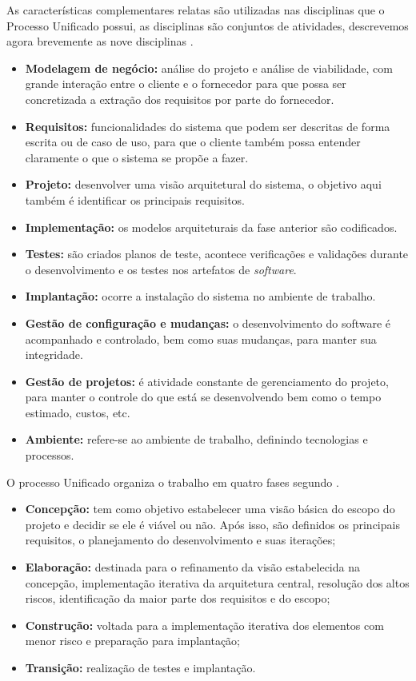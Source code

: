 As características complementares relatas são utilizadas nas disciplinas que o Processo Unificado possui, as disciplinas são conjuntos de atividades, descrevemos agora brevemente as nove disciplinas \cite{larman2007utilizando}.

\begin{itemize}
	\item \textbf{Modelagem de negócio:} análise do projeto e análise de viabilidade, com grande interação entre o cliente e o fornecedor para que possa ser concretizada a extração dos requisitos por parte do fornecedor.
	\item \textbf{Requisitos:} funcionalidades do sistema que podem ser descritas de forma escrita ou de caso de uso, para que o cliente também possa entender claramente o que o sistema se propõe a fazer.
	\item \textbf{Projeto:} desenvolver uma visão arquitetural do sistema, o objetivo aqui também é identificar os principais requisitos.
	\item \textbf{Implementação:} os modelos arquiteturais da fase anterior são codificados.
	\item \textbf{Testes:} são criados planos de teste, acontece verificações e validações durante o desenvolvimento e os testes nos artefatos de \textit{software}.
	\item \textbf{Implantação:} ocorre a instalação do sistema no ambiente de trabalho.
	\item \textbf{Gestão de configuração e mudanças:} o desenvolvimento do software é acompanhado e controlado, bem como suas mudanças, para manter sua integridade.
	\item \textbf{Gestão de projetos:} é atividade constante de gerenciamento do projeto, para manter o controle do que está se desenvolvendo bem como o tempo estimado, custos, etc. 
	\item \textbf{Ambiente:} refere-se ao ambiente de trabalho, definindo tecnologias  e processos.
\end{itemize}

O processo Unificado organiza o trabalho em quatro fases segundo . 
\begin{itemize}
	\item \textbf{Concepção:} tem como objetivo estabelecer uma visão básica do escopo do projeto e decidir se ele é viável ou não. Após isso, são definidos os principais requisitos, o planejamento do desenvolvimento e suas iterações;
	\item \textbf{Elaboração:} destinada para o refinamento da visão estabelecida na concepção, implementação iterativa da arquitetura central, resolução dos altos riscos, identificação da maior parte dos requisitos e do escopo;
	\item \textbf{Construção:} voltada para a implementação iterativa dos elementos com menor risco e preparação para implantação;
	\item \textbf{Transição:} realização de testes e implantação.
\end{itemize}

